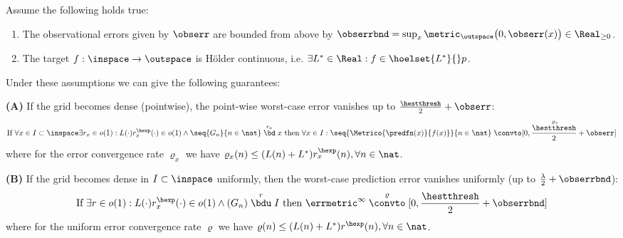 \begin{thm} \label{thm:convergenceifboundedconstandsamplecons_LACKI}
Assume the following holds true:
\begin{enumerate}
\item The observational errors given by $\obserr$ are bounded from above by $\obserrbnd= \sup_x \metric_\outspace\bigl(0,\obserr(x)\bigr) \in \Real_{\geq 0}$.
\item  The target $f: \inspace \to \outspace$ is H\"older continuous, i.e. $\exists L^* \in \Real: f \in \hoelset {L^*}{}  p$.
\end{enumerate}
%

Under these assumptions we can give the following guarantees: 

\textbf{(A)} If the grid becomes dense (pointwise), the point-wise worst-case error vanishes up to $\frac \hestthresh 2 + \obserr$:
$$
\text{If }\forall x \in I \subset \inspace \exists r_x \in o(1) : L(\cdot) r_x^\hexp(\cdot) \in o(1) \wedge \seq{G_n}{n \in \nat} \stackrel{r_x}{\bd} x  \text{ then }\forall x \in I : \seq{\Metrico{\predfn(x)}{f(x)}}{n \in \nat} \stackrel{\varrho_x} \convto [0,\frac \hestthresh 2 + \obserr]$$
where for the error convergence rate $\varrho_x$ we have $\varrho_x(n) \leq (L(n)+ L^*) r_x^\hexp(n) , \forall n \in \nat$. 

\textbf{(B)} If the grid becomes dense in $I \subset \inspace$ uniformly, then the worst-case prediction error vanishes uniformly (up to $\frac \lambda 2 + \obserrbnd$):
$$\text{If } \exists r \in o(1) :  L(\cdot) r_x^\hexp(\cdot) \in o(1) \wedge (G_n) \stackrel{r}{\bdu} I  \text{ then }  \errmetric^\infty \stackrel{\varrho}{\convto} [0,\frac \hestthresh 2 + \obserrbnd]$$
where for the uniform error convergence rate $\varrho$ we have $\varrho(n) \leq (L(n)+ L^*) r^\hexp(n) , \forall n \in \nat$. 

%
%
%



\end{thm}
